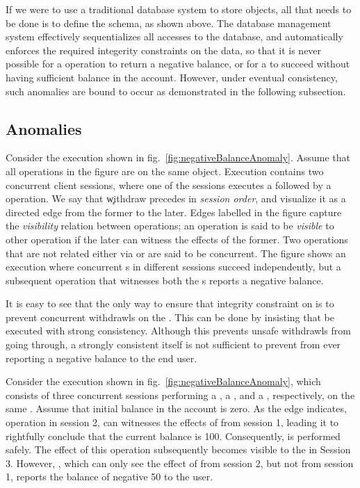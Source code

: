 If we were to use a traditional database system to store
 objects, all that needs to be done is to define the
 schema, as shown above. The database management
system effectively sequentializes all accesses to the database, and
automatically enforces the required integerity constraints on the
data, so that it is never possible for a  operation to
return a negative balance, or for a  to succeed without
having sufficient balance in the account. However, under eventual
consistency, such anomalies are bound to occur as demonstrated in the
following subsection. 


\subsection{Anomalies}

Consider the execution shown in fig.~\ref{fig:negativeBalanceAnomaly}.
Assume that all operations in the figure are on the same
 object. Execution contains two concurrent client
sessions, where one of the sessions executes a  followed
by a  operation. We say that \c{withdraw} precedes
 in \emph{session order}, and visualize it as a
directed  edge from the former to the later. Edges labelled
 in the figure capture the \emph{visibility} relation between
operations; an operation is said to be \emph{visible} to other
operation if the later can witness the effects of the former. Two
operations that are not related either via  or  are
said to be concurrent. The figure shows an execution where concurrent
s in different sessions succeed independently, but a
subsequent  operation that witnesses both the
s reports a negative balance. 

It is easy to see that the only way to ensure that integrity
constraint on  is to prevent concurrent withdrawls on the
. This can be done by insisting that  be
executed with strong consistency. Although this prevents unsafe
withdrawls from going through, a strongly consistent 
itself is not sufficient to prevent  from ever
reporting a negative balance to the end user.

Consider the execution shown in fig.~\ref{fig:negativeBalanceAnomaly},
which consists of three concurrent sessions performing a ,
a , and a , respectively, on the same
. Assume that initial balance in the account is zero.
As the  edge indicates, operation  in session
2, can witnesses the effects of  from session 1,
leading it to rightfully conclude that the current balance is 100.
Consequently,  is performed safely. The effect of
this  operation subsequently becomes visible to the
 in Session 3. However, , which can only
see the effect of  from session 2, but not 
from session 1, reports the balance of negative 50 to the user.

